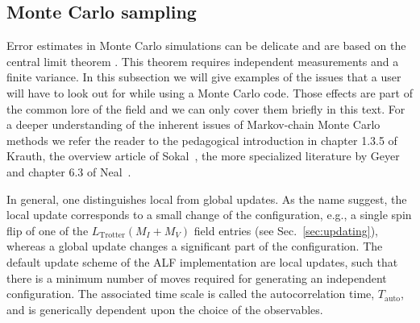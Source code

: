 %
\subsection{Monte Carlo sampling}\label{sec:sampling}
%
Error estimates  in Monte Carlo simulations  can be  delicate and are based on the central limit theorem \cite{Negele}. This theorem requires independent 
measurements and  a finite variance.
In this subsection we will give examples of the issues that a user will have to look out for while 
using a Monte Carlo code. Those effects are part of the common lore of the field
and we can only cover them briefly in this text.
For a deeper understanding of the inherent issues of Markov-chain Monte Carlo methods 
we refer the reader to the pedagogical introduction in chapter 1.3.5 of Krauth\cite{Krauth2006}, the overview article of Sokal~\cite{Sokal89},  the more specialized literature by Geyer~\cite{Geyer1992} and chapter 6.3 of Neal~\cite{neal1993}. 

In general, one distinguishes local from global updates. As the name suggest, the local update corresponds to a small change of the configuration, e.g., a single spin flip of one of the $L_{\mathrm{Trotter}}(M_I+M_V)$ field entries (see Sec.~\ref{sec:updating}), whereas a global update changes a significant part of the configuration. The default update scheme of the ALF implementation are local updates, such that there is a minimum number of moves required for generating an independent configuration. The associated time scale is called  the autocorrelation time, $T_\mathrm{auto}$, and is generically dependent upon the choice of the observables. 

